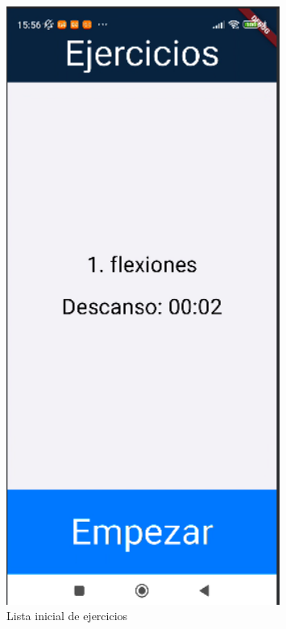 \begin{figure}[H]
   \centering
    \includegraphics[width=0.8\textwidth]{pantallas/listaIni.png}
    \caption{Lista inicial de ejercicios}
    \label{fig:listaIni}
\end{figure}

